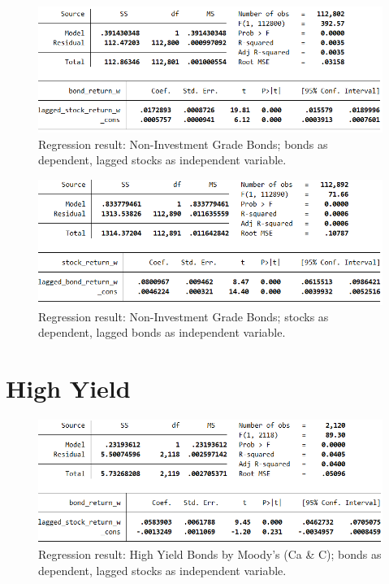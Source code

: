\begin{figure}[h!]
	\centering
	\includegraphics[width=1.0\linewidth]{figures/regression-results/regression-non-investment-grade-bonds-as-dependent.PNG}
	\caption{Regression result: Non-Investment Grade Bonds; bonds as dependent, lagged stocks as independent variable. }
	\label{fig:regression-non-investment-grade-bonds-as-dependent}
\end{figure}

\begin{figure}[h!]
	\centering
	\includegraphics[width=1.0\linewidth]{figures/regression-results/regression-non-investment-grade-stocks-as-dependent.PNG}
	\caption{Regression result: Non-Investment Grade Bonds; stocks as dependent, lagged bonds as independent variable. }
	\label{fig:regression-non-investment-grade-stocks-as-dependent}
\end{figure}

\section{High Yield}

\begin{figure}[h]
	\centering
	\includegraphics[width=1.0\linewidth]{figures/regression-results/regression-high-yield-ccc-d-moodies-bonds-as-dependent.PNG}
	\caption{Regression result: High Yield Bonds by Moody's (Ca \& C); bonds as dependent, lagged stocks as independent variable. }
	\label{fig:regression-high-yield-moodys-bonds-as-dependent}
\end{figure}

